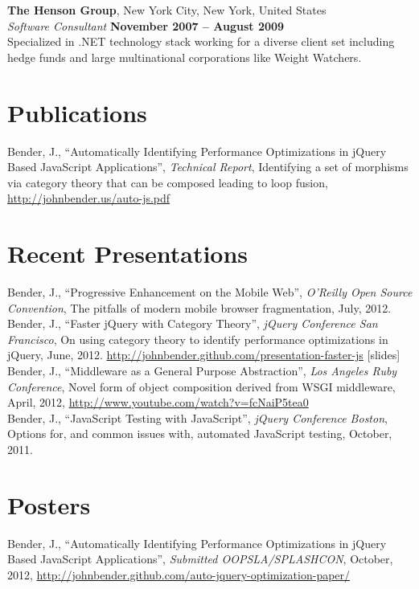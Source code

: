 \documentclass[margin,line]{resume}
\begin{document}
\begin{resume}
  \textbf{The Henson Group}, New York City, New York, United States \vspace{1mm}\\
  \textsl{Software Consultant} \hfill \textbf{November 2007 -- August 2009}\\
  Specialized in .NET technology stack working for a diverse client set including hedge funds and large multinational corporations like Weight Watchers.

  \section{\mysidestyle Publications}
  Bender, J., ``Automatically Identifying Performance Optimizations in jQuery Based JavaScript Applications'', \textsl{Technical Report}, Identifying a set of morphisms via category theory that can be composed leading to loop fusion, \url{http://johnbender.us/auto-js.pdf}

  \section{\mysidestyle Recent Presentations}
  Bender, J., ``Progressive Enhancement on the Mobile Web'', \textsl{O'Reilly Open Source Convention}, The pitfalls of modern mobile browser fragmentation, July, 2012.\vspace{2mm}\\
  Bender, J., ``Faster jQuery with Category Theory'', \textsl{jQuery Conference San Francisco}, On using category theory to identify performance optimizations in jQuery, June, 2012. \url{http://johnbender.github.com/presentation-faster-js} [slides]\vspace{2mm}\\
  Bender, J., ``Middleware as a General Purpose Abstraction'', \textsl{Los Angeles Ruby Conference}, Novel form of object composition derived from WSGI middleware, April, 2012, \url{http://www.youtube.com/watch?v=fcNaiP5tea0} \vspace{2mm}\\
  Bender, J., ``JavaScript Testing with JavaScript'', \textsl{jQuery Conference Boston}, Options for, and common issues with, automated JavaScript testing, October, 2011.

  \section{\mysidestyle Posters}
  Bender, J., ``Automatically Identifying Performance Optimizations in jQuery Based JavaScript Applications'', \textsl{Submitted OOPSLA/SPLASHCON}, October, 2012, \url{http://johnbender.github.com/auto-jquery-optimization-paper/}



\end{resume}
\end{document}
